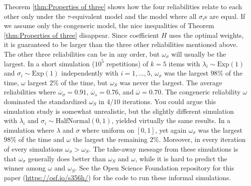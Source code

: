 \documentclass[twoside]{article}
\begin{document}
Theorem \ref{thm:Properties of three} shows how the four reliabilities relate to each other only under the $\tau$-equivalent model and the model where all $\sigma_i$s are equal. If we assume only the congeneric model, the nice inequalities of Theorem \ref{thm:Properties of three} disappear. Since coefficient $H$ uses the optimal weights, it is guaranteed to be larger than the three other reliabilities mentioned above. The
other three reliabilities can be in any order, but
$\omega_{\sigma}$ will usually be the largest. In a short
simulation ($10^{5}$ repetitions) of $k=5$ items with $\lambda_{i}\sim \textrm{Exp}(1)$
and $\sigma_{i}\sim \textrm{Exp}(1)$ independently with $i=1,\ldots,5$, $\omega_{\sigma}$
was the largest $98\%$ of the time, $\omega$ largest $2\%$
of the time, but $\omega_{S}$ was never the largest. The average reliabilities where $\overline{\omega}_\sigma = 0.91$, $\overline{\omega}_s= 0.76$, and $\overline{\omega} = 0.70$.
The congeneric reliability $\omega$ dominated the standardized $\omega_{S}$ in $4/10$ iterations. You could argue this simulation study
is somewhat unrealistic, but the slightly different simulation with $\lambda_{i}$ and $\sigma_{i}\sim \textrm{HalfNormal}(0,1)$, yielded virtually the same results. In a simulation where $\lambda$ and $\sigma$ where uniform on $[0,1]$, yet again $\omega_{\sigma}$
was the largest $98\%$ of the time and $\omega$ the largest the remaining $2\%$. Moreover, in every iteration of every simulations $\omega_\sigma > \omega_S$. The take-away message from these simulations is that $\omega_\sigma$ generally does better than $\omega_{S}$ and
$\omega$, while it is hard to predict the winner among $\omega$
and $\omega_{S}$. See the Open Science Foundation repository for this paper (\url{https://osf.io/s356h/}) for the code to run these informal simulations.
\end{document}

